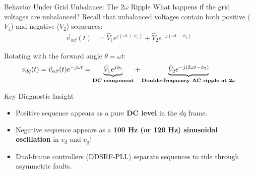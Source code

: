 \begin{frame}[allowframebreaks]{Behavior Under Grid Unbalance: The $2\omega$ Ripple}
    What happens if the grid voltages are unbalanced?
    Recall that unbalanced voltages contain both positive ($\bar{V}_1$) and negative ($\bar{V}_2$) sequences:
    \begin{align}
        \vec{v}_{\alpha\beta}(t) &= \hat{V}_1 e^{j(\omega t + \phi_1)} + \hat{V}_2 e^{-j(\omega t - \phi_2)}
    \end{align}

    Rotating with the forward angle $\theta = \omega t$:
    \begin{equation}
        v_{dq}(t) = \vec{v}_{\alpha\beta}(t) e^{-j\omega t} = \underbrace{\hat{V}_1 e^{j\phi_1}}_{\text{\bf DC component}} + \underbrace{\hat{V}_2 e^{-j(2\omega t - \phi_2)}}_{\text{\bf Double-frequency AC ripple at } \mathbf{2\omega}}
    \end{equation}

    \begin{alertblock}{Key Diagnostic Insight}
        \begin{itemize}
            \item Positive sequence appears as a pure \textbf{DC level} in the $dq$ frame.
            \item Negative sequence appears as a \textbf{100 Hz (or 120 Hz) sinusoidal oscillation} in $v_d$ and $v_q$!
            \item Dual-frame controllers (DDSRF-PLL) separate sequences to ride through asymmetric faults.
        \end{itemize}
    \end{alertblock}
\end{frame}

